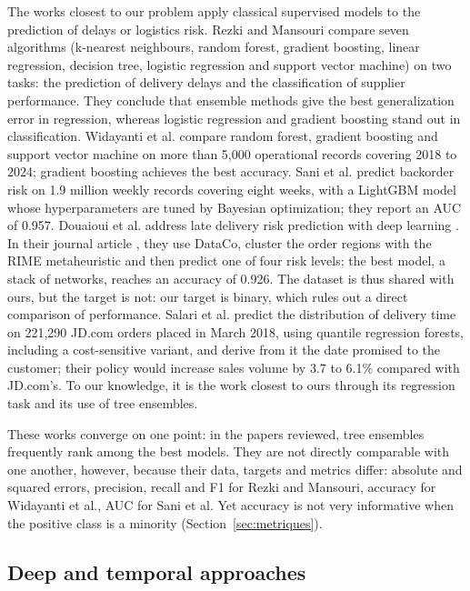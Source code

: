 \documentclass[11pt,a4paper]{article}
\theoremstyle{definition}
\begin{document}
The works closest to our problem apply classical supervised models to the prediction of delays or logistics risk. Rezki and Mansouri \cite{rezki2024machine} compare seven algorithms (k-nearest neighbours, random forest, gradient boosting, linear regression, decision tree, logistic regression and support vector machine) on two tasks: the prediction of delivery delays and the classification of supplier performance. They conclude that ensemble methods give the best generalization error in regression, whereas logistic regression and gradient boosting stand out in classification. Widayanti et al. \cite{widayanti2026predicting} compare random forest, gradient boosting and support vector machine on more than 5{,}000 operational records covering 2018 to 2024; gradient boosting achieves the best accuracy. Sani et al. \cite{sani2023supply} predict backorder risk on 1.9 million weekly records covering eight weeks, with a LightGBM model whose hyperparameters are tuned by Bayesian optimization; they report an AUC of 0.957. Douaioui et al. address late delivery risk prediction with deep learning \cite{douaioui2024deep,douaioui2024enhancing}. In their journal article \cite{douaioui2024enhancing}, they use DataCo, cluster the order regions with the RIME metaheuristic and then predict one of four risk levels; the best model, a stack of networks, reaches an accuracy of 0.926. The dataset is thus shared with ours, but the target is not: our target is binary, which rules out a direct comparison of performance. Salari et al. \cite{salari2022realtime} predict the distribution of delivery time on 221{,}290 JD.com orders placed in March 2018, using quantile regression forests, including a cost-sensitive variant, and derive from it the date promised to the customer; their policy would increase sales volume by 3.7 to 6.1\% compared with JD.com's. To our knowledge, it is the work closest to ours through its regression task and its use of tree ensembles.

These works converge on one point: in the papers reviewed, tree ensembles frequently rank among the best models. They are not directly comparable with one another, however, because their data, targets and metrics differ: absolute and squared errors, precision, recall and F1 for Rezki and Mansouri, accuracy for Widayanti et al., AUC for Sani et al. Yet accuracy is not very informative when the positive class is a minority (Section~\ref{sec:metriques}).

\subsection{Deep and temporal approaches}
\label{sec:rw-profond}
\end{document}
